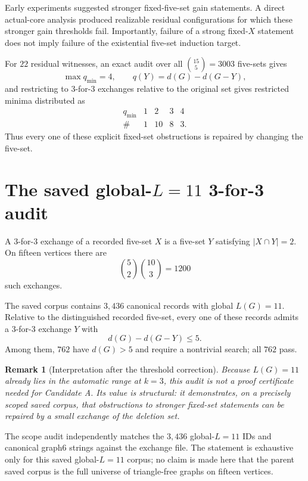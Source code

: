 \documentclass[11pt]{article}
\newtheorem{remark}{Remark}
\newcommand{\dd}{d}
\begin{document}
Early experiments suggested stronger fixed-five-set gain statements.  A
direct actual-core analysis produced realizable residual configurations
for which these stronger gain thresholds fail.  Importantly, failure of a
strong fixed-$X$ statement does not imply failure of the existential
five-set induction target.

For $22$ residual witnesses, an exact audit over all
$\binom{15}{5}=3003$ five-sets gives
\[
\max q_{\min}=4,
\qquad
q(Y)=\dd(G)-\dd(G-Y),
\]
and restricting to 3-for-3 exchanges relative to the original set gives
restricted minima distributed as
\[
\begin{array}{c|rrrr}
q_{\min} & 1 & 2 & 3 & 4\\ \hline
\# & 1 & 10 & 8 & 3.
\end{array}
\]
Thus every one of these explicit fixed-set obstructions is repaired by
changing the five-set.

\section{The saved global-$L=11$ 3-for-3 audit}

A 3-for-3 exchange of a recorded five-set $X$ is a five-set $Y$ satisfying
$|X\cap Y|=2$.  On fifteen vertices there are
\[
\binom52\binom{10}{3}=1200
\]
such exchanges.

The saved corpus contains $3{,}436$ canonical records with global
$L(G)=11$.  Relative to the distinguished recorded five-set, every one of
these records admits a 3-for-3 exchange $Y$ with
\[
\dd(G)-\dd(G-Y)\le5.
\]
Among them, $762$ have $\dd(G)>5$ and require a nontrivial search; all
$762$ pass.

\begin{remark}[Interpretation after the threshold correction]
Because $L(G)=11$ already lies in the automatic range at $k=3$, this audit
is not a proof certificate needed for Candidate A.  Its value is
structural: it demonstrates, on a precisely scoped saved corpus, that
obstructions to stronger fixed-set statements can be repaired by a small
exchange of the deletion set.
\end{remark}

The scope audit independently matches the $3{,}436$ global-$L=11$ IDs and
canonical graph6 strings against the exchange file.  The statement is
exhaustive only for this saved global-$L=11$ corpus; no claim is made here
that the parent saved corpus is the full universe of triangle-free graphs
on fifteen vertices.
\end{document}
